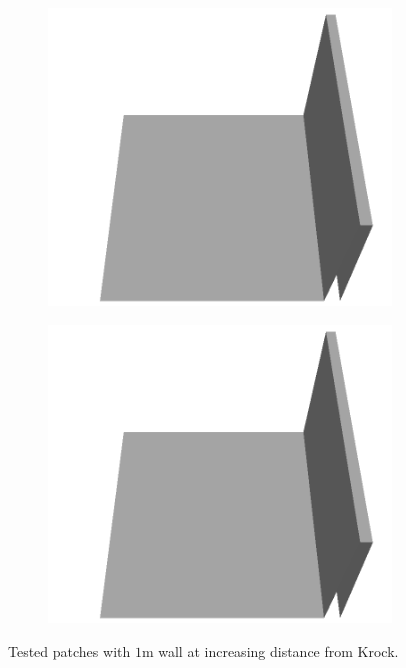 \documentclass[../document.tex]{subfiles}
\begin{document}
\begin{figure}[H]
\begin{subfigure}[b]{0.065\textwidth}
    \includegraphics[width=\linewidth]{../img/5/custom_patches/walls_front/all/01-3d.png}
    \end{subfigure}
    \begin{subfigure}[b]{0.065\textwidth}
    \includegraphics[width=\linewidth]{../img/5/custom_patches/walls_front/all/00-3d.png}
    \end{subfigure}
    \caption{Tested patches with $1$m wall at increasing distance from Krock.}
    \end{figure}
\end{document}
